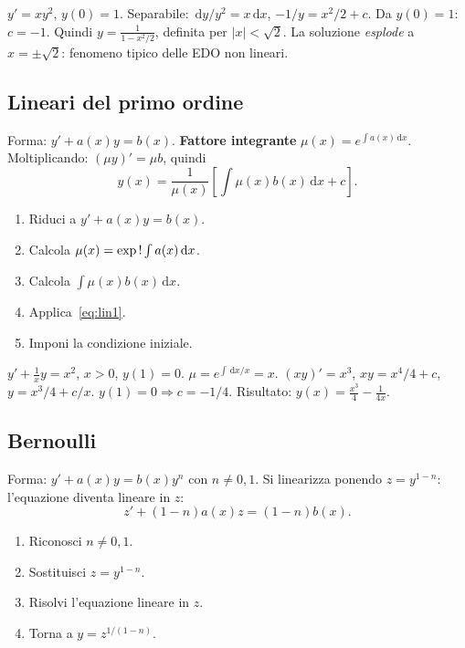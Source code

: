 \documentclass[11pt,a4paper,openany]{book}
\theoremstyle{plain}
\theoremstyle{definition}
\theoremstyle{remark}
\newcommand{\dd}{\,\mathrm{d}}
\newcommand{\abs}[1]{\left\lvert #1 \right\rvert}
\begin{document}
\begin{esempio}
$y'=xy^2$, $y(0)=1$. Separabile: $\dd y/y^2=x\dd x$, $-1/y=x^2/2+c$.
Da $y(0)=1$: $c=-1$. Quindi $y=\frac{1}{1-x^2/2}$, definita per
$\abs{x}<\sqrt{2}$. La soluzione \emph{esplode} a $x=\pm\sqrt{2}$:
fenomeno tipico delle EDO non lineari.
\end{esempio}

\subsection{Lineari del primo ordine}

Forma: $y'+a(x)y=b(x)$. \textbf{Fattore integrante} $\mu(x)=e^{\int a(x)\dd x}$.
Moltiplicando: $(\mu y)'=\mu b$, quindi
\begin{equation}
  y(x)=\frac{1}{\mu(x)}\left[\int\mu(x)b(x)\dd x+c\right].
  \label{eq:lin1}
\end{equation}

\begin{ricetta}
\begin{enumerate}[leftmargin=*]
  \item Riduci a $y'+a(x)y=b(x)$.
  \item Calcola $\mu(x)=\exp\\!\int a(x)\dd x$.
  \item Calcola $\int\mu(x)b(x)\dd x$.
  \item Applica~\eqref{eq:lin1}.
  \item Imponi la condizione iniziale.
\end{enumerate}
\end{ricetta}

\begin{esempio}
$y'+\frac{1}{x}y=x^2$, $x>0$, $y(1)=0$.
$\mu=e^{\int\dd x/x}=x$. $(xy)'=x^3$, $xy=x^4/4+c$, $y=x^3/4+c/x$.
$y(1)=0\Rightarrow c=-1/4$. Risultato: $y(x)=\frac{x^3}{4}-\frac{1}{4x}$.
\end{esempio}

\subsection{Bernoulli}

Forma: $y'+a(x)y=b(x)y^n$ con $n\ne 0,1$. Si linearizza ponendo
$z=y^{1-n}$: l'equazione diventa lineare in $z$:
\[
  z'+(1-n)a(x)z=(1-n)b(x).
\]

\begin{ricetta}
\begin{enumerate}[leftmargin=*]
  \item Riconosci $n\ne 0,1$.
  \item Sostituisci $z=y^{1-n}$.
  \item Risolvi l'equazione lineare in $z$.
  \item Torna a $y=z^{1/(1-n)}$.
\end{enumerate}
\end{ricetta}
\end{document}
